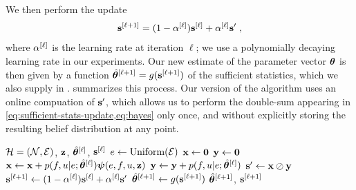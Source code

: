 \documentclass[aps,pre,reprint,superscriptaddress,nofootinbib]{revtex4-2}
\begin{document}
    We then perform the update 
    \begin{align*}
        \mathbf{s}^{[\ell+1]} = (1 - \alpha^{[\ell]} )\mathbf{s}^{[\ell]} + \alpha^{[\ell]} \mathbf{s}' \;,
    \end{align*}
    where $\alpha^{[\ell]}$ is the learning rate at iteration $\ell$; we use a polynomially decaying learning rate in our experiments.
    Our new estimate of the parameter vector $\boldsymbol{\theta}$ is then given by a function $\hat{\boldsymbol{\theta}}^{[\ell+1]} = g(\mathbf{s}^{[\ell+1]})$ of the sufficient statistics, which we also supply in .
     summarizes this process. 
    Our version of the algorithm uses an online compuation of $\mathbf{s}'$, which allows us to perform the double-sum appearing in \cref{eq:sufficient-stats-update,eq:bayes} only once, and without explicitly storing the resulting belief distribution at any point.  



    \begin{algorithm}[H]
        \caption{\model{} SEM Update Step}\label{alg:sem}
        \begin{algorithmic}
        \Require $\mathcal{H} = \left( \mathcal{N}, \mathcal{E} \right)$, $\mathbf{z}$, $\hat{\boldsymbol{\theta}}^{[\ell]}$, $\mathbf{s}^{[\ell]}$
        \State $e \gets \text{Uniform}(\mathcal{E})$
        \State $\mathbf{x} \gets \mathbf{0}$
        \State $\mathbf{y} \gets \mathbf{0}$
        \For{$\seededge \in \edges$}
            \If{$\seededge \prec \newedge$}
                \For{$\focalnode \in \newedge \cap \seededge$}
                    \State $\mathbf{x} \gets \mathbf{x} + p(f, u | e; \hat{\boldsymbol{\theta}}^{[\ell]}) \boldsymbol{\psi}(e, f, u, \mathbf{z})$
                    \State $\mathbf{y} \gets \mathbf{y} + p(f, u | e; \hat{\boldsymbol{\theta}}^{[\ell]})$
                \EndFor
            \EndIf
        \EndFor
        \State $\mathbf{s}' \gets \mathbf{x} \oslash \mathbf{y}$ 
        \State $\mathbf{s}^{[\ell+1]} \gets (1 - \alpha^{[\ell]} )\mathbf{s}^{[\ell]} + \alpha^{[\ell]} \mathbf{s}'$
        \State $\hat{\boldsymbol{\theta}}^{[\ell+1]} \gets g(\mathbf{s}^{[\ell+1]})$
        \State \Return $\hat{\boldsymbol{\theta}}^{[\ell+1]}$, $\mathbf{s}^{[\ell+1]}$
        \end{algorithmic}
    \end{algorithm}
\end{document}
